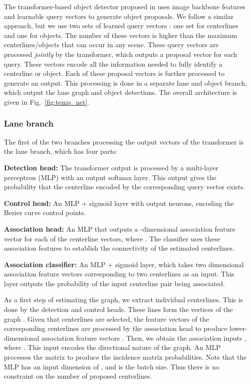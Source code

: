 \documentclass[10pt,twocolumn,letterpaper]{article}
\begin{document}
The transformer-based object detector proposed in \cite{DBLP:conf/eccv/CarionMSUKZ20} uses image backbone features and learnable query vectors to generate object proposals. We follow a similar approach, but we use two sets of learned query vectors : one set for centerlines and one for objects. The number of these vectors is higher than the maximum centerlines/objects that can occur in any scene. These query vectors are processed \emph{jointly} by the transformer, which outputs a proposal vector for each query. These vectors encode all the information needed to fully identify a centerline or object. Each of these proposal vectors is further processed to generate an output. This processing is done in a separate lane and object branch, which output the lane graph and object detections. The overall architecture is given in Fig.~\ref{fig:temp_net}. 



\subsubsection{Lane branch}
The first of the two branches processing the output vectors of the transformer is the lane branch, which has four parts:


\noindent\textbf{Detection head:} The transformer output is processed by a multi-layer perceptron (MLP) with an output softmax layer. This output gives the probability that the centerline encoded by the corresponding query vector exists. 

\noindent\textbf{Control head:} An MLP + sigmoid layer with  output neurons, encoding the  Bezier curve control points.

\noindent\textbf{Association head:} An MLP that outputs a -dimensional association feature vector for each of the centerline vectors, where . The classifier uses these association features to establish the connectivity of the estimated centerlines.   

\noindent\textbf{Association classifier:} An MLP + sigmoid layer, which takes two  dimensional association feature vectors corresponding to two centerlines as an input. This layer outputs the probability of the input centerline pair being associated.   

As a first step of estimating the graph, we extract individual centerlines. This is done by the detection and control heads. These lines form the vertices  of the graph . Given that  centerlines are selected, the feature vectors of the corresponding centerlines are processed by the association head to produce lower-dimensional association feature vectors . Then, we obtain the association inputs , where . This input encodes the directional nature of the graph. An MLP processes the matrix  to produce the incidence matrix probabilities. Note that the MLP has an input dimension of , and  is the batch size. Thus there is no constraint on the number of proposed centerlines.
\end{document}

